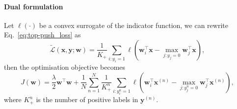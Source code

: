 \documentclass[9pt]{extarticle}
\newcommand{\x}{\mathbf{x}}
\newcommand{\y}{\mathbf{y}}
\newcommand{\1}{\mathbf{1}}
\newcommand{\w}{\mathbf{w}}
\newcommand{\LCal}{\mathcal{L}}
\newcommand{\pb}[1]{^{({#1})}}
\begin{document}
\paragraph{Dual formulation}
Let $\ell(\cdot)$ be a convex surrogate of the indicator function, we can rewrite Eq.~\ref{eq:top-push_loss} as
\begin{equation*}
\widetilde{\LCal}(\x, \y; \w) = \frac{1}{K_+} \sum_{i:y_i=1} \ell( \w_i^\top \x - \underset{j:y_j=0}{\max} \w_j^\top \x),
\end{equation*}
then the optimisation objective becomes
\begin{equation}
\label{eq:top-push_obj}
J(\w) = \frac{\lambda}{2} \w^\top \w + \frac{1}{N} \sum_{n=1}^N 
        \frac{1}{K_+^n} \sum_{i:y_i^n=1} \ell( \w_i^\top \x\pb{n} - \underset{j:y_j^n=0}{\max} \w_j^\top \x\pb{n}),
\end{equation}
where $K_+^n$ is the number of positive labels in $\y\pb{n}$.
\end{document}

